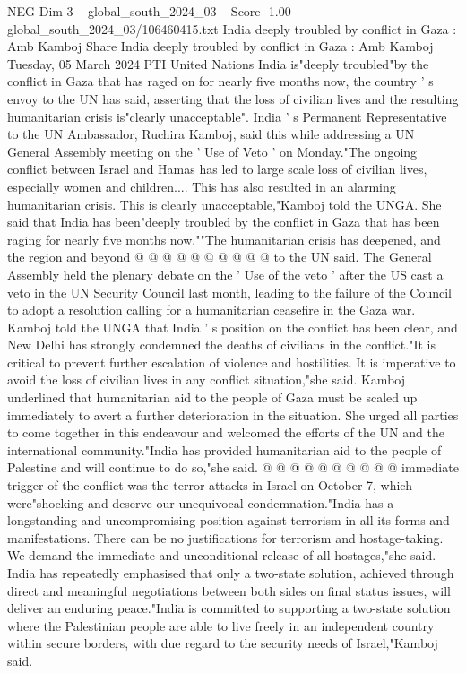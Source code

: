 \begin{textsample}{NEG Dim 3 – global\_south\_2024\_03 – Score -1.00 – global\_south\_2024\_03/106460415.txt}  \label{ex:f3_neg_047}
India deeply troubled by conflict in Gaza : Amb Kamboj Share India deeply troubled by conflict in Gaza : Amb Kamboj Tuesday, 05 March 2024 PTI United Nations India is"deeply troubled"by the conflict in Gaza that has raged on for nearly five months now, the country ' s envoy to the UN has said, asserting that the loss of civilian lives and the resulting humanitarian crisis is"clearly unacceptable".
India ' s Permanent Representative to the UN Ambassador, Ruchira Kamboj, said this while addressing a UN General Assembly meeting on the ' Use of Veto ' on Monday."The ongoing conflict between Israel and Hamas has led to large scale loss of civilian lives, especially women and children....
This has also resulted in an alarming humanitarian crisis.
This is clearly unacceptable,"Kamboj told the UNGA.
She said that India has been"deeply troubled by the conflict in Gaza that has been raging for nearly five months now.""The humanitarian crisis has deepened, and the region and beyond @ @ @ @ @ @ @ @ @ @ to the UN said.
The General Assembly held the plenary debate on the ' Use of the veto ' after the US cast a veto in the UN Security Council last month, leading to the failure of the Council to adopt a resolution calling for a humanitarian ceasefire in the Gaza war.
Kamboj told the UNGA that India ' s position on the conflict has been clear, and New Delhi has strongly condemned the deaths of civilians in the conflict."It is critical to prevent further escalation of violence and hostilities.
It is imperative to avoid the loss of civilian lives in any conflict situation,"she said.
Kamboj underlined that humanitarian aid to the people of Gaza must be scaled up immediately to avert a further deterioration in the situation.
She urged all parties to come together in this endeavour and welcomed the efforts of the UN and the international community."India has provided humanitarian aid to the people of Palestine and will continue to do so,"she said. @ @ @ @ @ @ @ @ @ @ immediate trigger of the conflict was the terror attacks in Israel on October 7, which were"shocking and deserve our unequivocal condemnation."India has a longstanding and uncompromising position against terrorism in all its forms and manifestations.
There can be no justifications for terrorism and hostage-taking.
We demand the immediate and unconditional release of all hostages,"she said.
India has repeatedly emphasised that only a two-state solution, achieved through direct and meaningful negotiations between both sides on final status issues, will deliver an enduring peace."India is committed to supporting a two-state solution where the Palestinian people are able to live freely in an independent country within secure borders, with due regard to the security needs of Israel,"Kamboj said.

\end{textsample}
